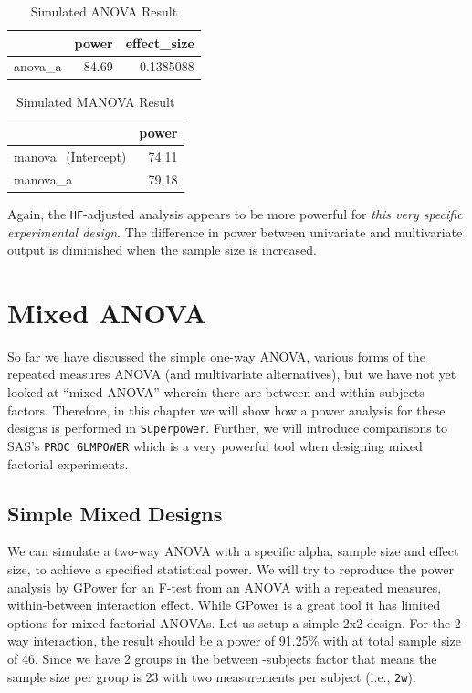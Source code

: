 \documentclass[
]{book}
\begin{document}
\begin{table}[!h]

\caption{\label{tab:unnamed-chunk-144}Simulated ANOVA Result}
\centering
\begin{tabular}[t]{l|r|r}
\hline
  & power & effect\_size\\
\hline
anova\_a & 84.69 & 0.1385088\\
\hline
\end{tabular}
\end{table}
\begin{table}[!h]

\caption{\label{tab:unnamed-chunk-145}Simulated MANOVA Result}
\centering
\begin{tabular}[t]{l|r}
\hline
  & power\\
\hline
manova\_(Intercept) & 74.11\\
\hline
manova\_a & 79.18\\
\hline
\end{tabular}
\end{table}

Again, the \texttt{HF}-adjusted analysis appears to be more powerful for \emph{this very specific experimental design}. The difference in power between univariate and multivariate output is diminished when the sample size is increased.

\hypertarget{mixed-anova}{%
\chapter{Mixed ANOVA}\label{mixed-anova}}

So far we have discussed the simple one-way ANOVA, various forms of the repeated measures ANOVA (and multivariate alternatives), but we have not yet looked at ``mixed ANOVA'' wherein there are between and within subjects factors. Therefore, in this chapter we will show how a power analysis for these designs is performed in \texttt{Superpower}. Further, we will introduce comparisons to SAS's \texttt{PROC\ GLMPOWER} which is a very powerful tool when designing mixed factorial experiments.

\hypertarget{simple-mixed-designs}{%
\section{Simple Mixed Designs}\label{simple-mixed-designs}}

We can simulate a two-way ANOVA with a specific alpha, sample size and effect size, to achieve a specified statistical power. We will try to reproduce the power analysis by GPower \citep{faul2007g} for an F-test from an ANOVA with a repeated measures, within-between interaction effect. While GPower is a great tool it has limited options for mixed factorial ANOVAs.
\newpage 
Let us setup a simple 2x2 design.
For the 2-way interaction, the result should be a power of 91.25\% with at total sample size of 46. Since we have 2 groups in the between -subjects factor that means the sample size per group is 23 with two measurements per subject (i.e., \texttt{2w}).
\end{document}
